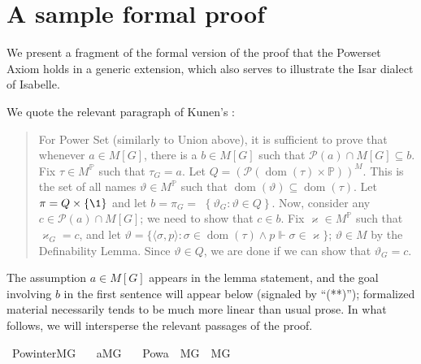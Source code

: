 \section{A sample formal proof}
\label{sec:sample-formal-proof}

We present a fragment of the formal version of the proof that the
Powerset Axiom holds in a generic extension, which also serves to
illustrate the Isar dialect of Isabelle.

We quote the relevant
paragraph of Kunen's \cite[Thm.~IV.2.27]{kunen2011set}:
\begin{quote}
  For Power Set (similarly to Union above), it is sufficient to prove
  that whenever $a \in M[G]$, there is a $b \in M[G]$ such that
  $\mathcal{P}(a) \cap M[G] \subseteq b$. Fix $\tau \in
  M^{\mathbb{P}}$ such that $\tau_{G}=a$. Let
  $Q=(\mathcal{P}(\operatorname{dom}(\tau) \times
  \mathbb{P}))^{M}$. This is the set of all names $\vartheta \in
  M^{\mathbb{P}}$ such that $\operatorname{dom}(\vartheta) \subseteq
  \operatorname{dom}(\tau)$. Let $\pi=Q \times\{\1\}$ and let
  $b=\pi_{G}=$ $\left\{\vartheta_{G}: \vartheta \in Q\right\}$. Now,
  consider any $c \in \mathcal{P}(a) \cap M[G]$; we need to show that
  $c \in b$. Fix $\varkappa \in M^{\mathbb{P}}$ such that
  $\varkappa_{G}=c$, and let $\vartheta=\{\langle\sigma, p\rangle:
  \sigma \in \operatorname{dom}(\tau) \wedge p \Vdash \sigma \in
  \varkappa\}$; $\vartheta \in M$ by the Definability Lemma. Since
  $\vartheta \in Q$, we are done if we can show that
  $\vartheta_{G}=c$.
\end{quote}
The assumption $a\in M[G]$ appears in the lemma statement, and the
goal involving $b$ in the first sentence will appear below (signaled
by “{\small (**)}”); formalized
material necessarily tends to be much more linear than usual prose. In
what follows, we
will intersperse the relevant passages of the proof.
\begin{isabelle}
\isamarkupfalse%
\ Pow{\isacharunderscore}{\kern0pt}inter{\isacharunderscore}{\kern0pt}MG{\isacharcolon}{\kern0pt}\isanewline
\ \ \ {\isachardoublequoteopen}a{\isasymin}M{\isacharbrackleft}{\kern0pt}G{\isacharbrackright}{\kern0pt}{\isachardoublequoteclose}\isanewline
\ \ \ {\isachardoublequoteopen}Pow{\isacharparenleft}{\kern0pt}a{\isacharparenright}{\kern0pt}\ {\isasyminter}\ M{\isacharbrackleft}{\kern0pt}G{\isacharbrackright}{\kern0pt}\ {\isasymin}\ M{\isacharbrackleft}{\kern0pt}G{\isacharbrackright}{\kern0pt}{\isachardoublequoteclose}\isanewline
%
\isamarkupfalse%
\ {\isacharminus}{\kern0pt}
\end{isabelle}
